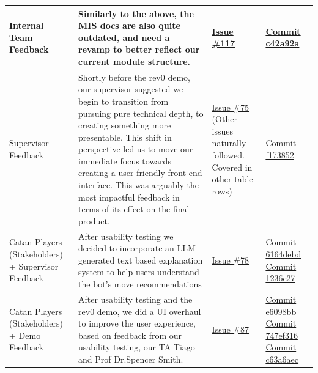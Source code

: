 \documentclass{article}
\begin{document}
\begin{landscape}
\begin{tabularx}{\linewidth}{|P{2.3cm}|Y|P{2.5cm}|P{3.5cm}|}
        \hline
        Internal Team Feedback &
        Similarly to the above, the MIS docs are also quite outdated, and need a revamp to better reflect our current module structure. &
        \href{https://github.com/AlgoCatan/RLCatan/issues/117}{Issue \#117} &
        \href{https://github.com/AlgoCatan/RLCatan/commit/c42a92a3e8fca3f58d34a3f9e3a6bc7627b71200}{Commit c42a92a} \\

        \hline
        Supervisor Feedback &
        Shortly before the rev0 demo, our supervisor suggested we begin to transition from pursuing pure technical depth, to creating something more presentable.
        This shift in perspective led us to move our immediate focus towards creating a user-friendly front-end interface.
        This was arguably the most impactful feedback in terms of its effect on the final product. &
        \href{https://github.com/AlgoCatan/RLCatan/issues/75}{Issue \#75}
        (Other issues naturally followed. Covered in other table rows) &
        \href{https://github.com/AlgoCatan/RLCatan/commit/f17385203af6483e7ba5eec9ee40adb6a563f61c}{Commit f173852} \\

        \hline
        Catan Players (Stakeholders) + Supervisor Feedback &
        After usability testing we decided to incorporate an LLM generated text based explanation system to help users understand the bot's move recommendations &
        \href{https://github.com/AlgoCatan/RLCatan/issues/78}{Issue \#78} &
        \href{https://github.com/AlgoCatan/RLCatan/commit/6164debd93fec9250a103d863f2908e080371332}{Commit 6164debd}
        \href{https://github.com/AlgoCatan/RLCatan/commit/1236c27b270ecb47aa10b6a302745fbdb701eac6}{Commit 1236c27} \\

        \hline
        Catan Players (Stakeholders) + Demo Feedback &
        After usability testing and the rev0 demo, we did a UI overhaul to improve the user experience, based on feedback from our usability testing, our TA Tiago and Prof Dr.Spencer Smith. &
        \href{https://github.com/AlgoCatan/RLCatan/issues/87}{Issue \#87} &
        \href{https://github.com/AlgoCatan/RLCatan/commit/e6098bb1c6546b6096112c31752d3dfbc729990c}{Commit e6098bb}
        \href{https://github.com/AlgoCatan/RLCatan/commit/747ef316da3f0032be4f767a35141bdf2b2c6b6c}{Commit 747ef316}
        \href{https://github.com/AlgoCatan/RLCatan/commit/c63a6aecbc468958ff8cdd93be348fdfcd3fdf3d}{Commit c63a6aec}\\



\end{tabularx}
\end{landscape}
\end{document}
